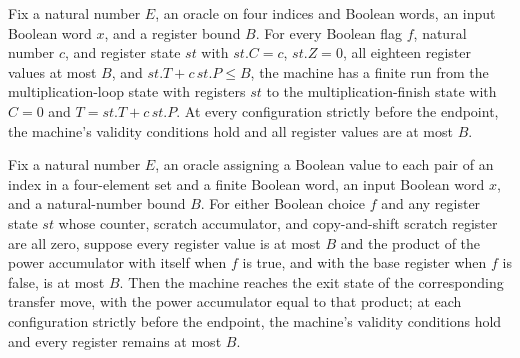 \begin{theorem}
\label{Complexity.LogProg.SavitchARM.mulL_run}
\leanok
{}
Fix a natural number $E$, an oracle on four indices and Boolean words, an input Boolean
word $x$, and a register bound $B$. For every Boolean flag $f$, natural number $c$, and
register state $st$ with $st.C=c$, $st.Z=0$, all eighteen register values at most $B$,
and $st.T+c\,st.P\le B$, the machine has a finite run from the multiplication-loop state
with registers $st$ to the multiplication-finish state with $C=0$ and $T=st.T+c\,st.P$.
At every configuration strictly before the endpoint, the machine's validity conditions
hold and all register values are at most $B$.
\end{theorem}

\begin{theorem}
\label{Complexity.LogProg.SavitchARM.mul_run}
\leanok
{}
Fix a natural number $E$, an oracle assigning a Boolean value to each pair of an index
in a four-element set and a finite Boolean word, an input Boolean word $x$, and a
natural-number bound $B$. For either Boolean choice $f$ and any register state $st$
whose counter, scratch accumulator, and copy-and-shift scratch register are all zero,
suppose every register value is at most $B$ and the product of the power accumulator
with itself when $f$ is true, and with the base register when $f$ is false, is at most
$B$. Then the machine reaches the exit state of the corresponding transfer move, with
the power accumulator equal to that product; at each configuration strictly before the
endpoint, the machine's validity conditions hold and every register remains at most $B$.
\end{theorem}

